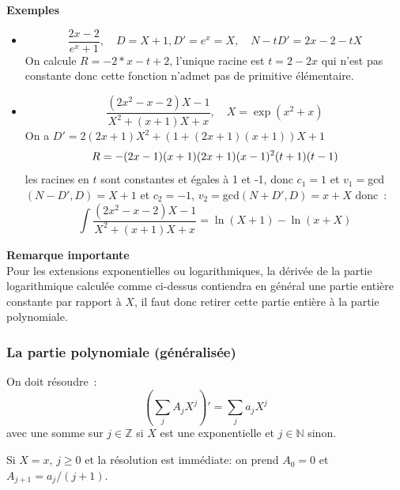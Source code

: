 \documentclass[a4paper,11pt]{article}
\newcommand{\Z}{{\mathbb{Z}}}
\newcommand{\N}{{\mathbb{N}}}
\begin{document}
\begin{giacjshere}
{\bf Exemples}
\begin{itemize}
\item
\[ \frac{2x-2}{e^x+1}, \quad D=X+1, D'=e^x=X, \quad N-tD'=2x-2-tX \]
On calcule $R=-2*x-t+2$, l'unique racine est $t=2-2x$ qui n'est
pas constante donc cette fonction n'admet pas de primitive élémentaire.
\item 
\[ \frac{(2x^2-x-2)X-1}{X^2+(x+1)X+x}, \quad X=\exp(x^2+x)\]
On a $D'=2(2x+1)X^2+(1+(2x+1)(x+1))X+1$
\[ R=-(2\*x-1)\*(x+1)\*(2\*x+1)\*(x-1)^2\*(t+1)\*(t-1) \]
les racines en $t$ sont constantes et égales à 1 et -1, donc $c_1=1$
et $v_1=$gcd$(N-D',D)=X+1$ et $c_2=-1$, $v_2=$gcd$(N+D',D)=x+X$
donc~:
\[ \int \frac{(2x^2-x-2)X-1}{X^2+(x+1)X+x} = \ln(X+1)-\ln(x+X)\]
\end{itemize}

{\bf Remarque importante}\\
Pour les extensions exponentielles ou logarithmiques, 
la d\'eriv\'ee de la partie logarithmique
calcul\'ee comme ci-dessus contiendra en g\'en\'eral 
une partie enti\`ere constante par rapport \`a $X$, il faut
donc retirer cette partie enti\`ere \`a la partie polynomiale.

\subsubsection{La partie polynomiale (généralisée)}
On doit résoudre~:
\[ (\sum_j A_j X^j)'=\sum_j a_j X^j \]
avec une somme sur $j \in\Z$ si $X$ est une exponentielle et
$j\in \N$ sinon.

Si $X=x$, $j\geq 0$ et la résolution est immédiate: on prend $A_0=0$ et 
$A_{j+1}=a_{j}/(j+1)$.


\end{giacjshere}
\end{document}

